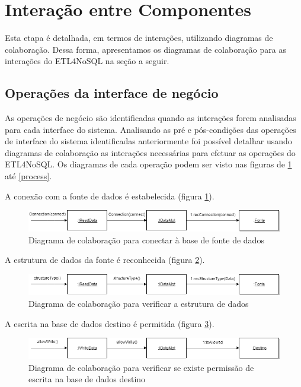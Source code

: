 \section{Interação entre Componentes}

Esta etapa é detalhada, em termos de interações, utilizando diagramas de colaboração. Dessa forma, apresentamos os diagramas de colaboração para as interações do ETL4NoSQL na seção a seguir.

\subsection{Operações da interface de negócio}

As operações de negócio são identificadas quando as interações forem analisadas para cada interface do sistema. Analisando as pré e pós-condições das operações de interface do sistema identificadas anteriormente foi possível detalhar usando diagramas de colaboração as interações necessárias para efetuar as operações do ETL4NoSQL. Os diagramas de cada operação podem ser visto nas figuras de \ref{colaboracao1} até \ref{process}.

A conexão com a fonte de dados é estabelecida (figura \ref{colaboracao1}).

\begin{figure}[h!]
	\centering
	\includegraphics[scale=0.5]{fig/colaboracao1.png}
	\caption{Diagrama de colaboração para conectar à base de fonte de dados}
	\label{colaboracao1}
\end{figure}

A estrutura de dados da fonte é reconhecida (figura \ref{colaboracao2}).

\begin{figure}[h!]
	\centering
	\includegraphics[scale=0.5]{fig/colaboracao2.png}
	\caption{Diagrama de colaboração para verificar a estrutura de dados}
	\label{colaboracao2}
\end{figure}

A escrita na base de dados destino é permitida (figura \ref{colaboracao3}).

\begin{figure}[h!]
	\centering
	\includegraphics[scale=0.5]{fig/colaboracao3.png}
	\caption{Diagrama de colaboração para verificar se existe permissão de escrita na base de dados destino}
	\label{colaboracao3}
\end{figure}

